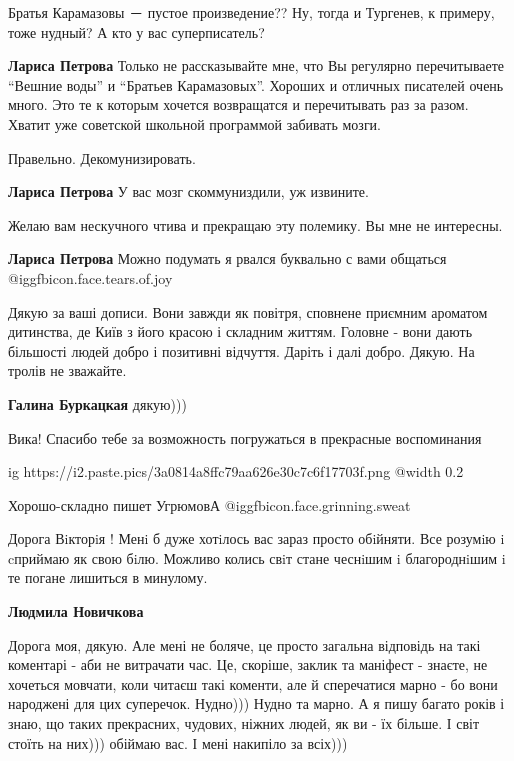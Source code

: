 \begin{itemize}
\begin{itemize}

Братья Карамазовы － пустое произведение?? Ну, тогда и Тургенев, к примеру,
тоже нудный? А кто у вас суперписатель?

\begin{itemize} %
\textbf{Лариса Петрова} Только не рассказывайте мне, что Вы регулярно перечитываете \enquote{Вешние воды} и \enquote{Братьев Карамазовых}. Хороших и отличных писателей очень много. Это те к которым хочется возвращатся и перечитывать раз за разом. Хватит уже советской школьной программой забивать мозги.
\end{itemize} %

Правельно. Декомунизировать.

\textbf{Лариса Петрова} У вас мозг скоммуниздили, уж извините.

Желаю вам нескучного чтива и прекращаю эту полемику. Вы мне не интересны.

\textbf{Лариса Петрова} Можно подумать я рвался буквально с вами общаться @igg{fbicon.face.tears.of.joy} 

\end{itemize} %


Дякую за ваші дописи. Вони завжди як повітря, сповнене приємним ароматом
дитинства, де Київ з його красою і складним життям. Головне - вони дають
більшості людей добро і позитивні відчуття. Даріть і далі добро. Дякую. На
тролів не зважайте.


\textbf{Галина Буркацкая} дякую)))

Вика! Спасибо тебе за возможность погружаться в прекрасные воспоминания

\ifcmt
  ig https://i2.paste.pics/3a0814a8ffc79aa626e30c7c6f17703f.png
  @width 0.2
\fi

Хорошо-складно пишет УгрюмовА  @igg{fbicon.face.grinning.sweat} 

Дорога Вiкторiя !
Менi б дуже хотiлось вас зараз просто обiйняти. Все розумiю i cприймаю як свою бiлю.
Можливо колись свiт стане чеснiшим i благороднiшим i те погане лишиться в минулому.

\begin{itemize} %
\textbf{Людмила Новичкова} 

Дорога моя, дякую. Але мені не боляче, це просто загальна відповідь на такі
коментарі - аби не витрачати час. Це, скоріше, заклик та маніфест - знаєте, не
хочеться мовчати, коли читаєш такі коменти, але й сперечатися марно - бо вони
народжені для цих суперечок. Нудно))) Нудно та марно. А я пишу багато років і
знаю, що таких прекрасних, чудових, ніжних людей, як ви - їх більше. І світ
стоїть на них))) обіймаю вас. І мені накипіло за всіх)))



\end{itemize}
\end{itemize}
